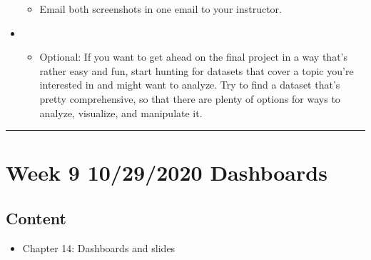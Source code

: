\documentclass[letterpaper,10pt,english]{sphinxmanual}
\begin{document}
\begin{itemize}
\begin{itemize}
\item {} 
Email both screenshots in one email to your instructor.

\end{itemize}

\item {} 
\begin{itemize}
\item {} 
Optional: If you want to get ahead on the final project in a way that’s rather easy and fun, start hunting for datasets that cover a topic you’re interested in and might want to analyze.  Try to find a dataset that’s pretty comprehensive, so that there are plenty of options for ways to analyze, visualize, and manipulate it.

\end{itemize}

\end{itemize}


\bigskip\hrule\bigskip



\section{Week 9 \sphinxhyphen{} 10/29/2020 \sphinxhyphen{} Dashboards}
\label{\detokenize{course-schedule:week-9-10-29-2020-dashboards}}

\subsection{Content}
\label{\detokenize{course-schedule:id15}}\begin{itemize}
\item {} 
Chapter 14: Dashboards \sphinxhyphen{} {\hyperref[\detokenize{chapter-14-dashboards::doc}]{}} and slides

\end{itemize}
\end{document}
